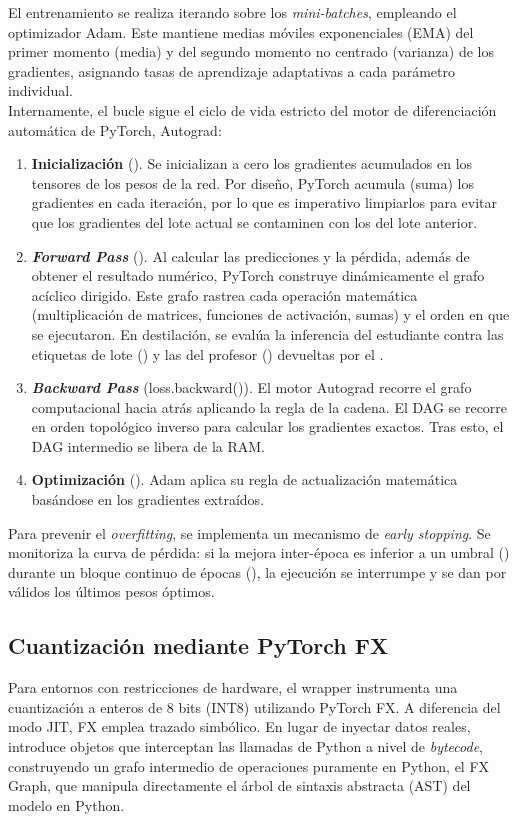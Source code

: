 \documentclass[a4paper,12pt,twoside,final]{book}
\begin{document}
El entrenamiento se realiza iterando sobre los \textit{mini-batches}, empleando el optimizador Adam. Este mantiene
medias móviles exponenciales (EMA) del primer momento (media) y del segundo momento no centrado (varianza) de los
gradientes, asignando tasas de aprendizaje adaptativas a cada parámetro individual.\\

Internamente, el bucle sigue el ciclo de vida estricto del motor de diferenciación automática de PyTorch, Autograd:
\begin{enumerate}
  \item \textbf{Inicialización} (). Se inicializan a cero los gradientes acumulados en los
  tensores de los pesos de la red. Por diseño, PyTorch acumula (suma) los gradientes en cada iteración, por lo que es
  imperativo limpiarlos para evitar que los gradientes del lote actual se contaminen con los del lote anterior.
  \item \textbf{\textit{Forward Pass}} (). Al calcular las predicciones y la pérdida, además de
  obtener el resultado numérico, PyTorch construye dinámicamente el grafo acíclico dirigido. Este grafo rastrea cada
  operación matemática (multiplicación de matrices, funciones de activación, sumas) y el orden en que se ejecutaron.
  En destilación, se evalúa la inferencia del estudiante contra las etiquetas de lote () y las del
  profesor () devueltas por el .
  \item \textbf{\textit{Backward Pass}} (loss.backward()). El motor Autograd recorre el grafo computacional hacia atrás
  aplicando la regla de la cadena. El DAG se recorre en orden topológico inverso para calcular los gradientes exactos.
  Tras esto, el DAG intermedio se libera de la RAM.
  \item \textbf{Optimización} (). Adam aplica su regla de actualización matemática basándose en
  los gradientes extraídos.
\end{enumerate}

Para prevenir el \textit{overfitting}, se implementa un mecanismo de \textit{early stopping}. Se monitoriza la curva de
pérdida: si la mejora inter-época es inferior a un umbral () durante un bloque continuo de épocas
(), la ejecución se interrumpe y se dan por válidos los últimos pesos óptimos.

\subsection{Cuantización mediante PyTorch FX}
Para entornos con restricciones de hardware, el wrapper instrumenta una cuantización a enteros de 8 bits (INT8)
utilizando PyTorch FX. A diferencia del modo JIT, FX emplea trazado simbólico. En lugar de inyectar datos reales,
introduce objetos  que interceptan las llamadas de Python a nivel de \textit{bytecode}, construyendo un
grafo intermedio de operaciones puramente en Python, el FX Graph, que manipula directamente el árbol de sintaxis
abstracta (AST) del modelo en Python.\\
\end{document}
